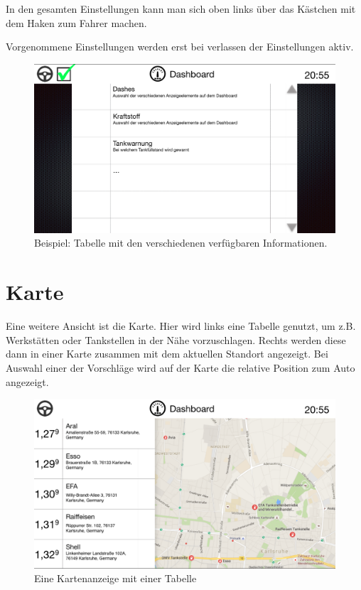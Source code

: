 \documentclass[pflichtenheft.tex]{subfiles}
\begin{document}
In den gesamten Einstellungen kann man sich oben links über das Kästchen mit dem Haken zum Fahrer machen.

Vorgenommene Einstellungen werden erst bei verlassen der Einstellungen aktiv.  

\begin{figure}[H]
  	\begin{center}
 		\includegraphics[width=\textwidth]{Images/GUI-Settings.png}
  		\caption{Beispiel: Tabelle mit den verschiedenen verfügbaren Informationen.}
  	\end{center}
\end{figure}

\clearpage
\section{Karte}
\label{sec:Karte}

Eine weitere Ansicht ist die Karte. Hier wird links eine Tabelle genutzt, um z.B. Werkstätten oder Tankstellen in der Nähe vorzuschlagen. Rechts werden diese dann in einer Karte zusammen mit dem aktuellen Standort angezeigt.
Bei Auswahl einer der Vorschläge wird auf der Karte die relative Position zum Auto angezeigt.
\begin{figure}[H]
  	\begin{center}
 		\includegraphics[width=\textwidth]{Images/GUI-Map.png}
  		\caption{Eine Kartenanzeige mit einer Tabelle}
  	\end{center}
\end{figure}
\end{document}
